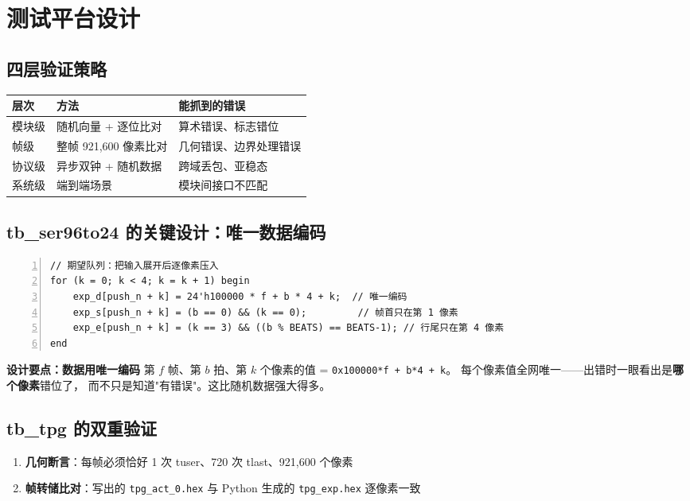 \section{测试平台设计}

\subsection{四层验证策略}

\begin{center}
\renewcommand{\arraystretch}{1.25}
\begin{tabular}{lll}
\toprule
\textbf{层次} & \textbf{方法} & \textbf{能抓到的错误} \\
\midrule
模块级 & 随机向量 + 逐位比对 & 算术错误、标志错位 \\
帧级   & 整帧 921,600 像素比对 & 几何错误、边界处理错误 \\
协议级 & 异步双钟 + 随机数据 & 跨域丢包、亚稳态 \\
系统级 & 端到端场景 & 模块间接口不匹配 \\
\bottomrule
\end{tabular}
\end{center}

\subsection{tb\_ser96to24 的关键设计：唯一数据编码}

\begin{Verbatim}[frame=single,fontsize=\small,numbers=left]
// 期望队列：把输入展开后逐像素压入
for (k = 0; k < 4; k = k + 1) begin
    exp_d[push_n + k] = 24'h100000 * f + b * 4 + k;  // 唯一编码
    exp_s[push_n + k] = (b == 0) && (k == 0);         // 帧首只在第 1 像素
    exp_e[push_n + k] = (k == 3) && ((b % BEATS) == BEATS-1); // 行尾只在第 4 像素
end
\end{Verbatim}

\textbf{设计要点：数据用唯一编码}\quad
第 $f$ 帧、第 $b$ 拍、第 $k$ 个像素的值 = \texttt{0x100000*f + b*4 + k}。
每个像素值全网唯一——出错时一眼看出是\textbf{哪个像素}错位了，
而不只是知道"有错误"。这比随机数据强大得多。

\subsection{tb\_tpg 的双重验证}

\begin{enumerate}
  \item \textbf{几何断言}：每帧必须恰好 1 次 tuser、720 次 tlast、921,600 个像素
  \item \textbf{帧转储比对}：写出的 \texttt{tpg\_act\_0.hex} 与 Python 生成的
        \texttt{tpg\_exp.hex} 逐像素一致
\end{enumerate}


